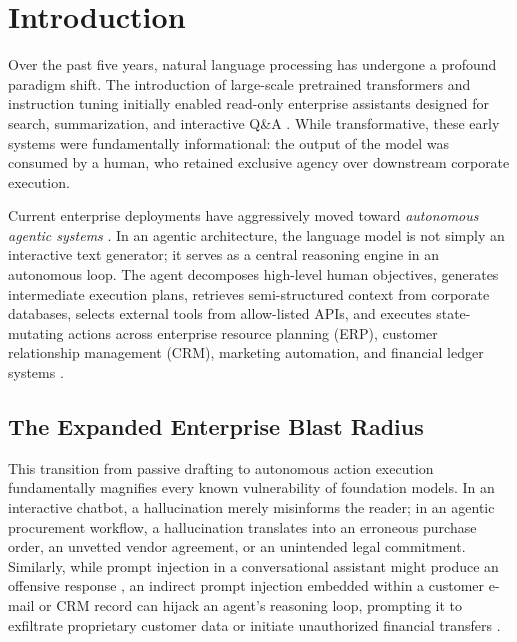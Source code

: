 \documentclass[10pt,a4paper,twocolumn]{article}
\begin{document}
{
  \renewcommand{\thefootnote}{\fnsymbol{footnote}}
}

\section{Introduction}
\label{sec:intro}
Over the past five years, natural language processing has undergone a profound paradigm shift. The introduction of large-scale pretrained transformers and instruction tuning \cite{ouyang2022instructgpt,vaswani2017attention} initially enabled read-only enterprise assistants designed for search, summarization, and interactive Q\&A \cite{lewis2020rag,gao2023ragsurvey}. While transformative, these early systems were fundamentally informational: the output of the model was consumed by a human, who retained exclusive agency over downstream corporate execution.

Current enterprise deployments have aggressively moved toward \emph{autonomous agentic systems} \cite{wang2024agents,yao2023react,schick2023toolformer}. In an agentic architecture, the language model is not simply an interactive text generator; it serves as a central reasoning engine in an autonomous loop. The agent decomposes high-level human objectives, generates intermediate execution plans, retrieves semi-structured context from corporate databases, selects external tools from allow-listed APIs, and executes state-mutating actions across enterprise resource planning (ERP), customer relationship management (CRM), marketing automation, and financial ledger systems \cite{anthropic2024effective,mialon2023augmented}.

\subsection{The Expanded Enterprise Blast Radius}
This transition from passive drafting to autonomous action execution fundamentally magnifies every known vulnerability of foundation models. In an interactive chatbot, a hallucination \cite{ji2023hallucination} merely misinforms the reader; in an agentic procurement workflow, a hallucination translates into an erroneous purchase order, an unvetted vendor agreement, or an unintended legal commitment. Similarly, while prompt injection in a conversational assistant might produce an offensive response \cite{perez2022ignore}, an indirect prompt injection embedded within a customer e-mail or CRM record can hijack an agent's reasoning loop, prompting it to exfiltrate proprietary customer data or initiate unauthorized financial transfers \cite{greshake2023indirect,zhan2024injecagent}.
\end{document}
